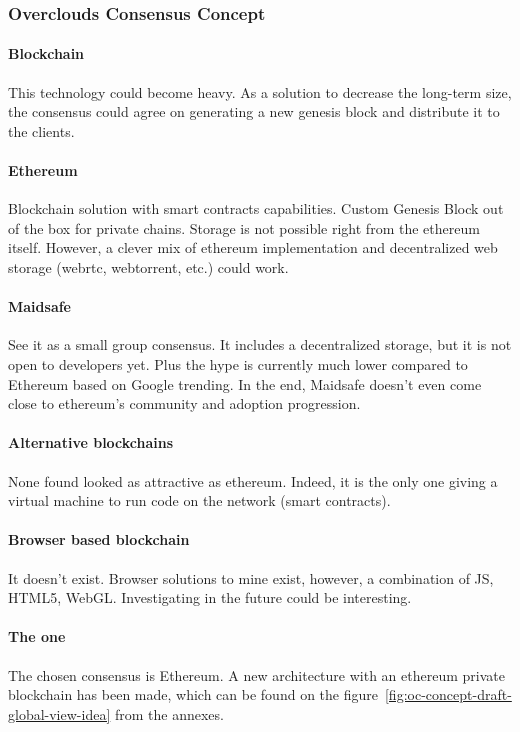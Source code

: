\subsubsection{Overclouds Consensus Concept}

\paragraph{Blockchain} This technology could become heavy. As a solution to decrease the long-term size, the consensus could agree on generating a new genesis block and distribute it to the clients.

\paragraph{Ethereum} Blockchain solution with smart contracts capabilities. Custom Genesis Block out of the box for private chains. Storage is not possible right from the ethereum itself. However, a clever mix of ethereum implementation and decentralized web storage (webrtc, webtorrent, etc.) could work.

\paragraph{Maidsafe} See it as a small group consensus. It includes a decentralized storage, but it is not open to developers yet. Plus the hype is currently much lower compared to Ethereum based on Google trending. In the end, Maidsafe doesn't even come close to ethereum's community and adoption progression.

\paragraph{Alternative blockchains} None found looked as attractive as ethereum. Indeed, it is the only one giving a virtual machine to run code on the network (smart contracts).

\paragraph{Browser based blockchain} It doesn't exist. Browser solutions to mine exist, however, a combination of JS, HTML5, WebGL. Investigating in the future could be interesting.

\paragraph{The one}The chosen consensus is Ethereum. A new architecture with an ethereum private blockchain has been made, which can be found on the figure~\ref{fig:oc-concept-draft-global-view-idea} from the annexes.


